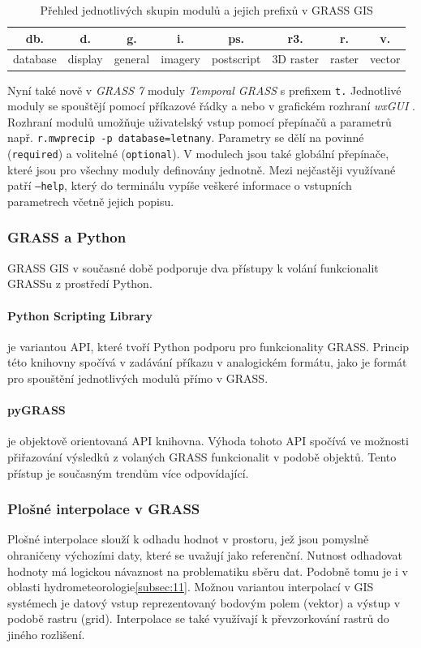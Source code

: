 \documentclass[a4paper,12pt,oneside]{report}
\begin{document}
\begin{table}[h]
\centering
\begin{tabular}{|cccccccc|}
\hline
db. & d. & g. & i. & ps. & r3. & r. & v. \\
\hline \hline
database & display & general & imagery & postscript & 3D raster & raster & vector \\ \hline
\end{tabular}
\caption{Přehled jednotlivých skupin modulů a jejich prefixů v GRASS GIS}
\label{tab:module}
\end{table}


Nyní také nově v \textit{GRASS 7} moduly \textit{Temporal GRASS} s prefixem \texttt{t.} Jednotlivé moduly se spouštějí pomocí příkazové řádky a nebo v grafickém rozhraní \textit{wxGUI} . Rozhraní modulů umožňuje uživatelský vstup pomocí přepínačů a parametrů např. \texttt{r.mwprecip -p database=letnany}. Parametry se dělí na povinné (\texttt{required}) a volitelné (\texttt{optional}). V modulech jsou také globální přepínače, které jsou pro všechny moduly definovány jednotně. Mezi nejčastěji využívané patří \texttt{--help}, který do terminálu vypíše veškeré informace o vstupních parametrech včetně jejich  popisu.

\subsubsection*{GRASS a Python}
GRASS GIS v současné době podporuje dva přístupy k volání funkcionalit GRASSu z prostředí Python.
\paragraph*{Python Scripting Library} je variantou API, které tvoří Python podporu pro funkcionality GRASS. Princip této knihovny spočívá v zadávání příkazu v analogickém formátu, jako je formát pro spouštění jednotlivých modulů přímo v GRASS.
\paragraph*{pyGRASS} je objektově orientovaná API knihovna. Výhoda tohoto API spočívá ve možnosti přiřazování výsledků z volaných GRASS funkcionalit v podobě objektů. Tento přístup je současným trendům více odpovídající.

\subsubsection{Plošné interpolace v GRASS }
\label{sec:plostneinterpolace}
Plošné interpolace slouží k odhadu hodnot v prostoru, jež jsou pomyslně ohraničeny výchozími daty, které se uvažují jako referenční. Nutnost odhadovat hodnoty má logickou návaznost na problematiku sběru dat.  Podobně tomu je i v oblasti hydrometeorologie\ref{subsec:11}. Možnou variantou interpolací v GIS systémech je datový vstup reprezentovaný bodovým polem (vektor) a výstup v podobě rastru (grid). Interpolace se také využívají k převzorkování rastrů do jiného rozlišení.
\end{document}

